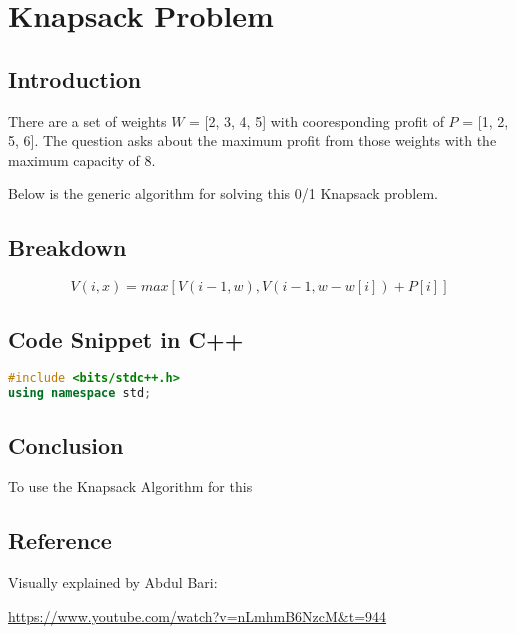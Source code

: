 \documentclass{article}
\begin{document}
\section{Knapsack Problem}
\subsection{Introduction}
There are a set of weights $W$ = [2, 3, 4, 5] with cooresponding
profit of $P$ = [1, 2, 5, 6]. The question asks about the maximum 
profit from those weights with the maximum capacity of 8. 


Below is the generic algorithm for solving this 0/1 Knapsack problem.
\subsection{Breakdown}

\begin{equation*}
    V( i,x) = max[ V( i-1, w), V( i-1, w-w[ i])+P[ i]]
\end{equation*}
\subsection{Code Snippet in C++}
\begin{lstlisting}[language=C++]
#include <bits/stdc++.h>
using namespace std;
\end{lstlisting}
\subsection{Conclusion}
To use the Knapsack Algorithm for this 
\subsection{Reference}
Visually explained by Abdul Bari: 


\url{https://www.youtube.com/watch?v=nLmhmB6NzcM&t=944}
\end{document}
